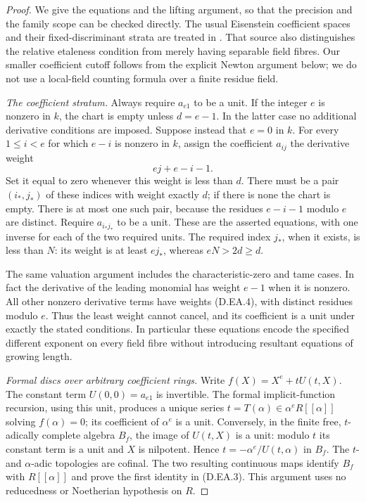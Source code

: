 \begin{proof}
We give the equations and the lifting argument, so that the precision
and the family scope can be checked directly. The usual Eisenstein
coefficient spaces and their fixed-discriminant strata are treated in
\citet[Section 4, particularly Proposition 4.4, Corollary 4.6 and
Lemma 4.7]{Yasuda2025EisensteinB}. That source also distinguishes the
relative etaleness condition from merely having separable field fibres.
Our smaller coefficient cutoff follows from the explicit Newton
argument below; we do not use a local-field counting formula over a
finite residue field.

\emph{The coefficient stratum.}
Always require $a_{e1}$ to be a unit. If the integer $e$ is nonzero
in $k$, the chart is empty unless $d=e-1$. In the latter case no
additional derivative conditions are imposed. Suppose instead that
$e=0$ in $k$. For every $1\le i<e$ for which $e-i$ is nonzero in $k$,
assign the coefficient $a_{ij}$ the derivative weight
\[
                         ej+e-i-1.                    \tag{D.EA.4}
\]
Set it equal to zero whenever this weight is less than $d$.
There must be a pair $(i_*,j_*)$ of these indices with weight exactly
$d$; if there is none the chart is empty. There is at most one such
pair, because the residues $e-i-1$ modulo $e$ are distinct. Require
$a_{i_*j_*}$ to be a unit. These are the asserted equations, with
one inverse for each of the two required units. The required index
$j_*$, when it exists, is less than $N$: its weight is at least
$ej_*$, whereas $eN>2d\ge d$.

The same valuation argument includes the characteristic-zero and
tame cases. In fact the derivative of the leading monomial has
weight $e-1$ when it is nonzero. All other nonzero derivative terms
have weights (D.EA.4), with distinct residues modulo $e$. Thus the
least weight cannot cancel, and its coefficient is a unit under
exactly the stated conditions. In particular these equations encode
the specified different exponent on every field fibre without
introducing resultant equations of growing length.

\emph{Formal discs over arbitrary coefficient rings.}
Write $f(X)=X^e+tU(t,X)$. The constant term $U(0,0)=a_{e1}$ is
invertible. The formal implicit-function recursion, using this unit,
produces a unique series $t=T(\alpha)\in\alpha^eR[[\alpha]]$ solving
$f(\alpha)=0$; its coefficient of $\alpha^e$ is a unit.
Conversely, in the finite free, $t$-adically complete algebra $B_f$,
the image of $U(t,X)$ is a unit: modulo $t$ its constant term is a
unit and $X$ is nilpotent. Hence $t=-\alpha^e/U(t,\alpha)$ in $B_f$.
The $t$- and $\alpha$-adic topologies are cofinal. The two resulting
continuous maps identify $B_f$ with $R[[\alpha]]$ and prove the
first identity in (D.EA.3). This argument uses no reducedness or
Noetherian hypothesis on $R$.


\end{proof}
